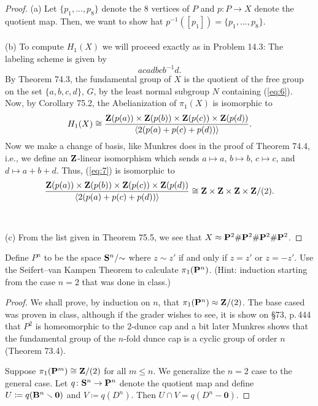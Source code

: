 \begin{proof}
(a) Let $\{p_1,...,p_8\}$ denote the $8$ vertices of $P$ and $p\colon P\to
X$ denote the quotient map. Then, we want to show hat
$p^{-1}([p_1])=\{p_1,...,p_8\}$.
\\\\
(b) To compute $H_1(X)$ we will proceed exactly as in Problem 14.3: The
labeling scheme is given by
\begin{equation}
\label{eq:6}
acadbcb^{-1}d.
\end{equation}
By Theorem 74.3, the fundamental group of $X$ is the quotient of the free
group on the set $\{a,b,c,d\}$, $G$, by the least normal subgroup $N$
containing (\ref{eq:6}). Now, by Corollary 75.2, the Abelianization of
$\pi_1(X)$ is isomorphic to
\begin{equation}
\label{eq:7}
H_1(X)\cong
\frac{\mathbf{Z}(p(a))\times\mathbf{Z}(p(b))\times\mathbf{Z}(p(c))\times\mathbf{Z}(p(d))}
{\left<2(p(a)+p(c)+p(d))\right>}.
\end{equation}
Now we make a change of basis, like Munkres does in the proof of Theorem
74.4, i.e., we define an $\mathbf{Z}$-linear isomorphism which sends $a\mapsto a$,
$b\mapsto b$, $c\mapsto c$, and $d\mapsto a+b+d$. Thus, (\ref{eq:7}) is
isomorphic to
\[
\frac{\mathbf{Z}(p(a))\times\mathbf{Z}(p(b))\times\mathbf{Z}(p(c))\times\mathbf{Z}(p(d))}
{\left<2(p(a)+p(c)+p(d))\right>}\cong\mathbf{Z}\times\mathbf{Z}\times\mathbf{Z}\times\mathbf{Z}/(2).
\]
\\\\
(c) From the list given in Theorem 75.5, we see that
$X\approx\mathbf{P}^2\#\mathbf{P}^2\#\mathbf{P}^2\#\mathbf{P}^2$.
\end{proof}
\newpage
\begin{problem}[A]
Define $P^n$ to be the space $\mathbf{S}^n/{\sim}$ where $z\sim z'$ if and only
if $z=z'$ or $z=-z'$. Use the Seifert--van Kampen Theorem to calculate
$\pi_1(\mathbf{P}^n)$. (Hint: induction starting from the case $n=2$ that was
done in class.)
\end{problem}
\begin{proof}
We shall prove, by induction on $n$, that
$\pi_1(\mathbf{P}^n)\approx\mathbf{Z}/(2)$. The base cased was proven in class,
although if the grader wishes to see, it is show on \S73, p.\,444 that
$P^2$ is homeomorphic to the $2$-dunce cap and a bit later Munkres shows
that the fundamental group of the $n$-fold dunce cap is a cyclic group of
order $n$ (Theorem 73.4).

Suppose $\pi_1(\mathbf{P}^m)\cong\mathbf{Z}/(2)$ for all $m\leq n$. We generalize the
$n=2$ case to the general case. Let $q\colon\mathbf{S}^n\to\mathbf{P}^n$ denote the
quotient map and define $U\coloneqq q(\mathbf{B}^n\smallsetminus\mathbf{0})$ and
$V\coloneqq q(D^n)$. Then $U\cap V=q(D^n\minus\mathbf{0})$.
\end{proof}

